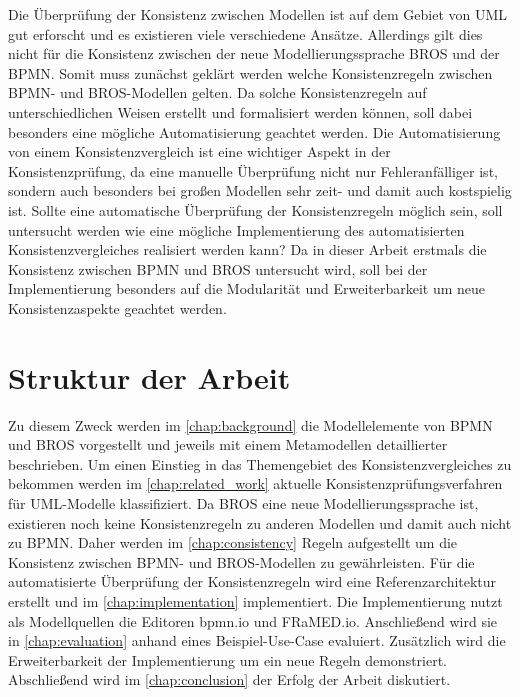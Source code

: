 Die Überprüfung der Konsistenz zwischen Modellen ist auf dem Gebiet von UML gut erforscht und es existieren viele verschiedene Ansätze.
Allerdings gilt dies nicht für die Konsistenz zwischen der neue Modellierungssprache BROS und der BPMN.
Somit muss zunächst geklärt werden welche Konsistenzregeln zwischen BPMN- und BROS-Modellen gelten.
Da solche Konsistenzregeln auf unterschiedlichen Weisen erstellt und formalisiert werden können, soll dabei besonders eine mögliche Automatisierung geachtet werden.
Die Automatisierung von einem Konsistenzvergleich ist eine wichtiger Aspekt in der Konsistenzprüfung, da eine manuelle Überprüfung nicht nur Fehleranfälliger ist, sondern auch besonders bei großen Modellen sehr zeit- und damit auch kostspielig ist.
Sollte eine automatische Überprüfung der Konsistenzregeln möglich sein, soll untersucht werden wie eine mögliche Implementierung des automatisierten Konsistenzvergleiches realisiert werden kann?
Da in dieser Arbeit erstmals die Konsistenz zwischen BPMN und BROS untersucht wird, soll bei der Implementierung besonders auf die Modularität und Erweiterbarkeit um neue Konsistenzaspekte geachtet werden.

\section{Struktur der Arbeit}

Zu diesem Zweck werden im \cref{chap:background} die Modellelemente von BPMN und BROS vorgestellt und jeweils mit einem Metamodellen detaillierter beschrieben.
Um einen Einstieg in das Themengebiet des Konsistenzvergleiches zu bekommen werden im \cref{chap:related_work} aktuelle Konsistenzprüfungsverfahren für UML-Modelle klassifiziert.
Da BROS eine neue Modellierungssprache ist, existieren noch keine Konsistenzregeln zu anderen Modellen und damit auch nicht zu BPMN.
Daher werden im \cref{chap:consistency} Regeln aufgestellt um die Konsistenz zwischen BPMN- und BROS-Modellen zu gewährleisten.
Für die automatisierte Überprüfung der Konsistenzregeln wird eine Referenzarchitektur erstellt und im \cref{chap:implementation} implementiert.
Die Implementierung nutzt als Modellquellen die Editoren bpmn.io und FRaMED.io.
Anschließend wird sie in \cref{chap:evaluation} anhand eines Beispiel-Use-Case evaluiert.
Zusätzlich wird die Erweiterbarkeit der Implementierung um ein neue Regeln demonstriert.
Abschließend wird im \cref{chap:conclusion} der Erfolg der Arbeit diskutiert.
